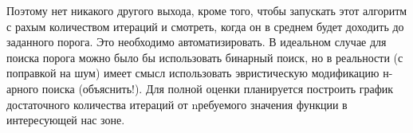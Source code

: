 \documentclass[11pt]{article}
\begin{document}
\begin{itemize}
        Поэтому нет никакого другого выхода, кроме того, чтобы запускать этот алгоритм с рахым количеством итераций и смотреть, когда он в среднем будет доходить до заданного порога.
        Это необходимо автоматизировать.
        В идеальном случае для поиска порога можно было бы использовать бинарный поиск, но в реальности (с поправкой на шум) имеет смысл использовать эвристическую модификацию н-арного поиска (объяснить!).
        Для полной оценки планируется построить график достаточного количества итераций от nребуемого значения функции в интересующей нас зоне.

    \end{itemize}
\end{document}
